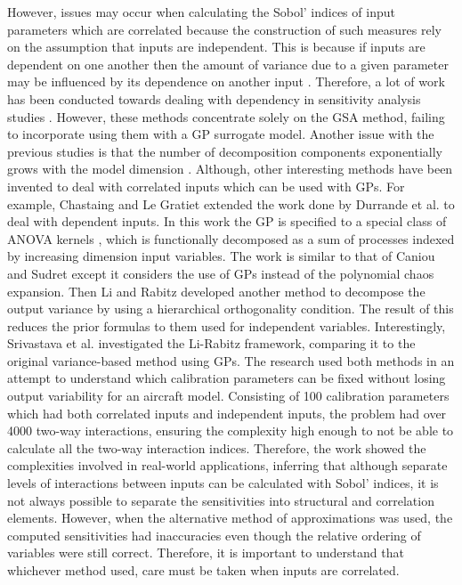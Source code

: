 \documentclass[preprint,12pt]{elsarticle}
\begin{document}
	However, issues may occur when calculating the Sobol' indices of input parameters which are correlated because the construction of such measures rely on the assumption that inputs are independent. This is because if inputs are dependent on one another then the amount of variance due to a given parameter may be influenced by its dependence on another input \cite{Mara2012}. Therefore, a lot of work has been conducted towards dealing with dependency in sensitivity analysis studies \cite{Xu2008,Li2010,Caniou2010,Chastaing2015}. However, these methods concentrate solely on the GSA method, failing to incorporate using them with a GP surrogate model. Another issue with the previous studies is that the number of decomposition components exponentially grows with the model dimension \cite{Chastaing2015a}. Although, other interesting methods have been invented to deal with correlated inputs which can be used with GPs. For example, Chastaing and Le Gratiet \cite{Chastaing2015a} extended the work done by Durrande et al. \cite{Durrande2013} to deal with dependent inputs. In this work the GP is specified to a special class of ANOVA kernels \cite{Berlinet2004}, which is functionally decomposed as a sum of processes indexed by increasing dimension input variables. The work is similar to that of Caniou and Sudret \cite{Caniou2010} except it considers the use of GPs instead of the polynomial chaos expansion. Then Li and Rabitz \cite{Li2012} developed another method to decompose the output variance by using a hierarchical orthogonality condition. The result of this reduces the prior formulas to them used for independent variables. Interestingly, Srivastava et al. \cite{Srivastava2017} investigated the Li-Rabitz framework, comparing it to the original variance-based method using GPs. The research used both methods in an attempt to understand which calibration parameters can be fixed without losing output variability for an aircraft model. Consisting of 100 calibration parameters which had both correlated inputs and independent inputs, the problem had over 4000 two-way interactions, ensuring the complexity high enough to not be able to calculate all the two-way interaction indices. Therefore, the work showed the complexities involved in real-world applications, inferring that although separate levels of interactions between inputs can be calculated with Sobol' indices, it is not always possible to separate the sensitivities into structural and correlation elements. However, when the alternative method of approximations was used, the computed sensitivities had inaccuracies even though the relative ordering of variables were still correct. Therefore, it is important to understand that whichever method used, care must be taken when inputs are correlated.
	
\end{document}
